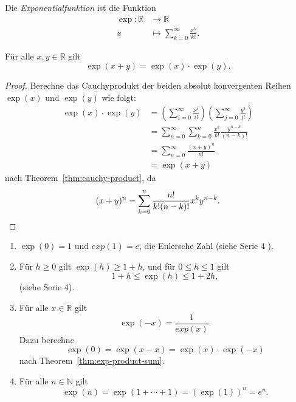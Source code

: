 \documentclass[../main.tex]{subfiles}
\begin{document}
\begin{definition}
  Die \emph{Exponentialfunktion} ist die Funktion
  \begin{align*}
    \exp \colon \mathbb{R} & \to \mathbb{R} \\
    x & \mapsto \sum_{k=0}^{\infty} \frac{x^k}{k!}.
  \end{align*}
\end{definition}

\begin{theorem}\label{thm:exp-product-sum}
  Für alle $x, y \in \mathbb{R}$ gilt
  \[
    \exp(x + y) = \exp (x) \cdot \exp (y).
  \]
\end{theorem}

\begin{proof}
  Berechne das Cauchyprodukt
  der beiden absolut konvergenten Reihen
  $\exp(x)$ und $\exp(y)$ wie folgt:
  \begin{align*}
    \exp(x) \cdot \exp(y) & =
    \left(\sum_{i=0}^{\infty} \frac{x^i}{i!}\right)
    \left( \sum_{j=0}^{\infty} \frac{y^j}{j!} \right)\\ &
    = \sum_{n=0}^{\infty} \sum_{k=0}^{n} \frac{x^k}{k!} 
    \frac{y^{n-k}}{(n-k)!} \\ &
    = \sum_{n=0}^{\infty} \frac{(x + y)^n}{n!} \\&
    = \exp(x + y)
  \end{align*}
  nach Theorem~\ref{thm:cauchy-product},
  da
  \[
    (x + y)^n = \sum_{k=0}^{n} \frac{n!}{k!(n-k)!} x^k y^{n-k}.
    \qedhere
  \]
\end{proof}

\begin{eig-exp}
  \leavevmode
  \begin{enumerate}[\normalfont(i)]
    \item $\exp(0) = 1$ und $exp(1) = e$, die Eulersche Zahl
      (siehe Serie 4%
      ).
    \item Für $h \geq 0$ gilt $\exp(h) \geq 1 + h$,
      und für $0 \leq h \leq 1$ gilt  
      \[
        1 + h \leq \exp(h) \leq 1 + 2h,
      \]
      (siehe Serie 4). %
    \item Für alle $x \in \mathbb{R}$ gilt
      \[
        \exp(-x) = \frac{1}{exp(x)}.
      \]
      Dazu berechne
      \[
        \exp(0) = \exp(x - x) = \exp(x) \cdot \exp(-x)
      \]
      nach Theorem~\ref{thm:exp-product-sum}.
    \item Für alle
      $n \in \mathbb{N}$ gilt
      \[
        \exp(n) = \exp(1 + \cdots + 1) =
        \left( \exp(1) \right)^n = e^n.
      \]
  \end{enumerate}
\end{eig-exp}
\end{document}
